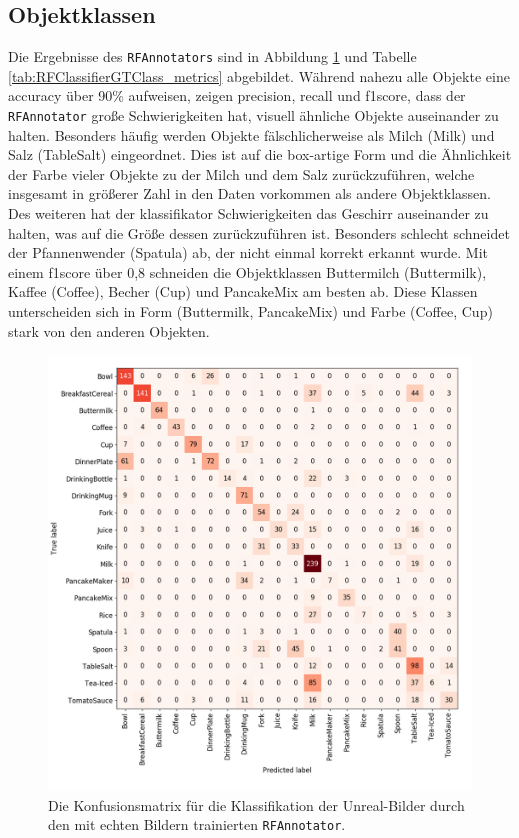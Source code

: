 \subsection{Objektklassen}
Die Ergebnisse des \texttt{RFAnnotators} sind in Abbildung \ref{fig:RFClassifierGTClass_confMatrix} und Tabelle \ref{tab:RFClassifierGTClass_metrics} abgebildet. Während nahezu alle Objekte eine \gls{accuracy} über 90\% aufweisen, zeigen \gls{precision}, \gls{recall} und \gls{f1score}, dass der \texttt{RFAnnotator} große Schwierigkeiten hat, visuell ähnliche Objekte auseinander zu halten. Besonders häufig werden Objekte fälschlicherweise als Milch (Milk) und Salz (TableSalt)  eingeordnet. Dies ist auf die box-artige Form und die Ähnlichkeit der Farbe vieler Objekte zu der Milch und dem Salz zurückzuführen, welche insgesamt in größerer Zahl in den Daten vorkommen als andere Objektklassen. Des weiteren hat der \gls{klassifikator} Schwierigkeiten das Geschirr auseinander zu halten, was auf die Größe dessen zurückzuführen ist. Besonders schlecht schneidet der Pfannenwender (Spatula) ab, der nicht einmal korrekt erkannt wurde. Mit einem \gls{f1score} über 0,8 schneiden die Objektklassen Buttermilch (Buttermilk), Kaffee (Coffee), Becher (Cup) und PancakeMix am besten ab. Diese Klassen unterscheiden sich in Form (Buttermilk, PancakeMix) und Farbe (Coffee, Cup) stark von den anderen Objekten.  

\begin{figure}
	\includegraphics[scale=.4]{img/chapter6/RFClassifierGTClass.png}
\caption[Konfusionsmatrix der Klassifizierung durch den RFAnnotators]{Die Konfusionsmatrix für die Klassifikation der Unreal-Bilder durch den mit echten Bildern trainierten \texttt{RFAnnotator}.}
\label{fig:RFClassifierGTClass_confMatrix}
\end{figure}

